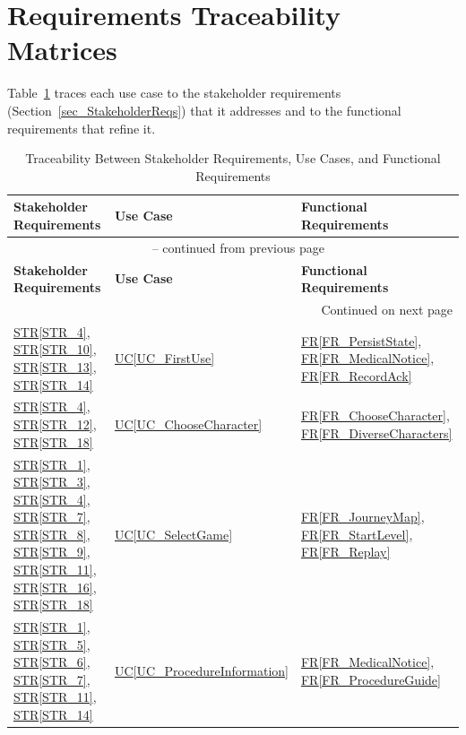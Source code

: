 \documentclass[10pt]{article}
\newcommand{\strref}[1]{\hyperref[#1]{STR\ref*{#1}}}
\newcommand{\ucref}[1]{\hyperref[#1]{UC\ref*{#1}}}
\newcommand{\rref}[1]{\hyperref[#1]{FR\ref*{#1}}}
\begin{document}
\newpage
\section{Requirements Traceability Matrices}
\label{sec_TraceMatrices}

Table~\ref{tab:SR2UC2FRtm} traces each use case to the stakeholder
requirements (Section~\ref{sec_StakeholderReqs}) that it addresses and to the
functional requirements that refine it.

\begin{longtable}{@{}p{} p{} p{}@{}}

\caption{Traceability Between Stakeholder Requirements, Use Cases, and Functional Requirements}
\label{tab:SR2UC2FRtm}\\
\toprule
\textbf{Stakeholder Requirements} & \textbf{Use Case} & \textbf{Functional Requirements} \\
\midrule
\endfirsthead

\multicolumn{3}{c}{\tablename\ \thetable{} -- continued from previous page} \\
\toprule
\textbf{Stakeholder Requirements} & \textbf{Use Case} & \textbf{Functional Requirements} \\
\midrule
\endhead

\midrule
\multicolumn{3}{r}{Continued on next page} \\
\endfoot

\bottomrule
\endlastfoot

\strref{STR_4}, \strref{STR_10}, \strref{STR_13}, \strref{STR_14}
& \ucref{UC_FirstUse} & \rref{FR_PersistState}, \rref{FR_MedicalNotice}, \rref{FR_RecordAck} \\

\strref{STR_4}, \strref{STR_12}, \strref{STR_18} 
& \ucref{UC_ChooseCharacter} & \rref{FR_ChooseCharacter}, \rref{FR_DiverseCharacters} \\

\strref{STR_1}, \strref{STR_3}, \strref{STR_4}, \strref{STR_7}, \strref{STR_8}, 
\strref{STR_9}, \strref{STR_11}, \strref{STR_16}, \strref{STR_18} 
& \ucref{UC_SelectGame} & \rref{FR_JourneyMap}, \rref{FR_StartLevel}, \rref{FR_Replay} \\

\strref{STR_1}, \strref{STR_5}, \strref{STR_6}, \strref{STR_7}, \strref{STR_11}, 
\strref{STR_14} 
& \ucref{UC_ProcedureInformation} & \rref{FR_MedicalNotice}, \rref{FR_ProcedureGuide} \\


\end{longtable}
\end{document}
